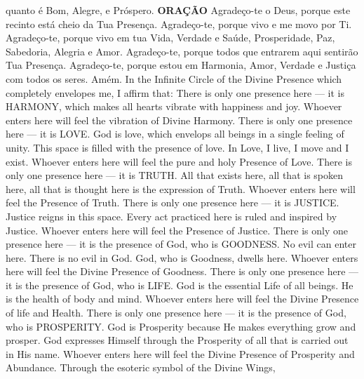     quanto é Bom, Alegre, e Próspero.
    \parspace
    \textbf{ORAÇÃO}
    \parspace
    Agradeço-te o Deus, porque este recinto está cheio
    da Tua Presença.
    \parspace
    Agradeço-te, porque vivo e me movo por Ti.
    \parspace
    Agradeço-te, porque vivo em tua Vida, Verdade e
    Saúde, Prosperidade, Paz, Sabedoria, Alegria e Amor.
    \parspace
    Agradeço-te, porque todos que entrarem aqui sentirão
    Tua Presença.
    \parspace
    Agradeço-te, porque estou em Harmonia, Amor, Verdade
    e Justiça com todos os seres.
    \parspace
    Amém.
  \endverse
  \brk
  \beginverse
    In the Infinite Circle of the Divine Presence which
    completely envelopes me, I affirm that:
    \parspace
    There is only one presence here --- it is HARMONY,
    which makes all hearts vibrate with happiness and
    joy. Whoever enters here will feel the vibration
    of Divine Harmony.
    \parspace
    There is only one presence here --- it is LOVE.
    God is love, which envelops all beings in a single
    feeling of unity. This space is filled with the
    presence of love. In Love, I live, I move and I
    exist. Whoever enters here will feel the pure and
    holy Presence of Love.
    \parspace
    There is only one presence here --- it is TRUTH.
    All that exists here, all that is spoken here,
    all that is thought here is the expression of
    Truth. Whoever enters here will feel the Presence
    of Truth.
    \parspace
    There is only one presence here --- it is JUSTICE.
    Justice reigns in this space. Every act practiced
    here is ruled and inspired by Justice. Whoever
    enters here will feel the Presence of Justice.
    \parspace
    There is only one presence here --- it is the
    presence of God, who is GOODNESS. No evil can enter
    here. There is no evil in God. God, who is Goodness,
    dwells here. Whoever enters here will feel the
    Divine Presence of Goodness.
    \parspace
    There is only one presence here --- it is the
    presence of God, who is LIFE. God is the essential
    Life of all beings. He is the health of body and
    mind. Whoever enters here will feel the Divine
    Presence of life and Health.
    \parspace
    There is only one presence here --- it is the
    presence of God, who is PROSPERITY. God is
    Prosperity because He makes everything grow and
    prosper. God expresses Himself through the
    Prosperity of all that is carried out in His name.
    Whoever enters here will feel the Divine Presence
    of Prosperity and Abundance.
    \parspace
    Through the esoteric symbol of the Divine Wings,
